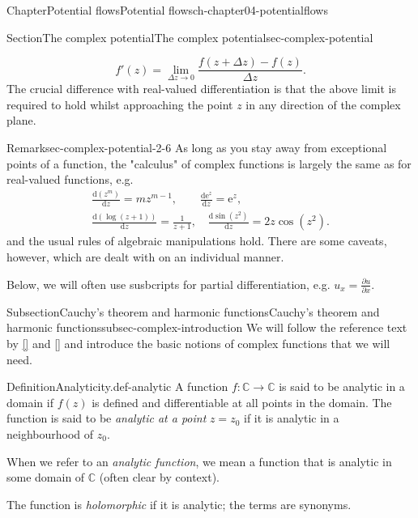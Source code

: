 \documentclass[oneside,10pt,]{book}
\newcommand{\xreffont}{\relax}
\numberwithin{equation}{section}
\newcommand{\e}{\mathrm{e}}
\newcommand{\de}{\mathrm{d}}
\newcommand{\dd}[2]{\frac{\de#1}{\de#2}}
\newcommand{\pd}[2]{\frac{\partial#1}{\partial#2}}
\begin{document}
\begin{chapterptx}{Chapter}{Potential flows}{}{Potential flows}{}{}{ch-chapter04-potentialflows}
\begin{sectionptx}{Section}{The complex potential}{}{The complex potential}{}{}{sec-complex-potential}
\begin{introduction}{}
\begin{equation}
f'(z) = \lim_{\Delta z \to 0} \frac{f(z + \Delta z) - f(z)}{\Delta z}.\label{eqn-complex-derivative}
\end{equation}
The crucial difference with real-valued differentiation is that the above limit is required to hold whilst approaching the point \(z\) in any direction of the complex plane.%
\begin{remark}{Remark}{}{sec-complex-potential-2-6}%
As long as you stay away from exceptional points of a function, the "calculus" of complex functions is largely the same as for real-valued functions, e.g.%
\begin{gather*}
\dd{(z^m)}{z} = mz^{m-1}, \qquad \dd{\e^z}{z} = \e^z,\\
\dd{(\log (z+1))}{z} = \frac{1}{z + 1}, \quad \dd{\sin(z^2)}{z} = 2z\cos(z^2). 
\end{gather*}
and the usual rules of algebraic manipulations hold. There are some caveats, however, which are dealt with on an individual manner.%
\end{remark}
Below, we will often use susbcripts for partial differentiation, e.g. \(u_x = \pd{u}{x}\).%
\end{introduction}%
%
%
\typeout{************************************************}
\typeout{************************************************}
%
\begin{subsectionptx}{Subsection}{Cauchy's theorem and harmonic functions}{}{Cauchy's theorem and harmonic functions}{}{}{subsec-complex-introduction}
We will follow the reference text by \hyperlink{ref-kreyszig}{[{\xreffont 2}]} and \hyperlink{ref-fornberg}{[{\xreffont 6}]}  and introduce the basic notions of complex functions that we will need.%
\begin{definition}{Definition}{Analyticity.}{def-analytic}%
%
A function \(f: \mathbb{C} \to \mathbb{C}\) is said to be analytic in a domain if \(f(z)\) is defined and differentiable at all points in the domain. The function is said to be \emph{analytic at a point} \(z = z_0\) if it is analytic in a neighbourhood of \(z_0\).%
\par
When we refer to an \emph{analytic function}, we mean a function that is analytic in some domain of \(\mathbb{C}\) (often clear by context).%
\par
The function is \emph{holomorphic} if it is analytic; the terms are synonyms.%
\par

\end{definition}
\end{subsectionptx}
\end{sectionptx}
\end{chapterptx}
\end{document}
